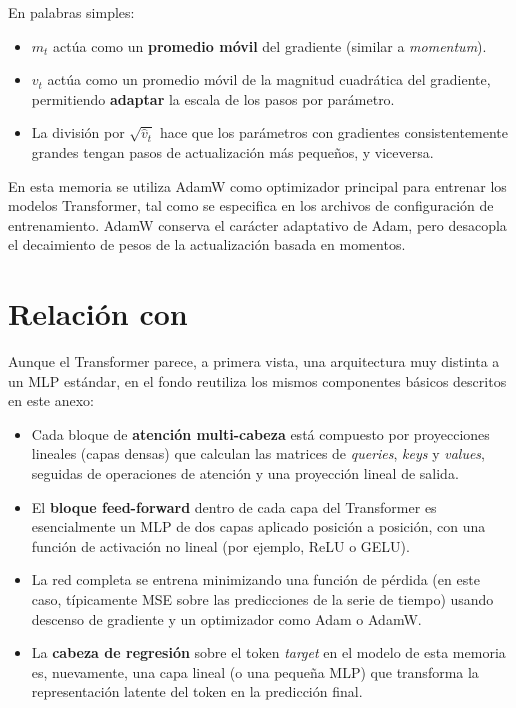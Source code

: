 En palabras simples:
\begin{itemize}
    \item $m_t$ actúa como un \textbf{promedio móvil} del gradiente (similar a \textit{momentum}).
    \item $v_t$ actúa como un promedio móvil de la magnitud cuadrática del gradiente, permitiendo \textbf{adaptar} la escala de los pasos por parámetro.
    \item La división por $\sqrt{\hat{v}_t}$ hace que los parámetros con gradientes consistentemente grandes tengan pasos de actualización más pequeños, y viceversa.
\end{itemize}

En esta memoria se utiliza AdamW como optimizador principal para entrenar los modelos Transformer, tal como se especifica en los archivos de configuración de entrenamiento. AdamW conserva el carácter adaptativo de Adam, pero desacopla el decaimiento de pesos de la actualización basada en momentos.

\section{Relación con \CTTransformer}

Aunque el Transformer parece, a primera vista, una arquitectura muy distinta a un MLP estándar, en el fondo reutiliza los mismos componentes básicos descritos en este anexo:

\begin{itemize}
    \item Cada bloque de \textbf{atención multi-cabeza} está compuesto por proyecciones lineales (capas densas) que calculan las matrices de \textit{queries}, \textit{keys} y \textit{values}, seguidas de operaciones de atención y una proyección lineal de salida.
    \item El \textbf{bloque feed-forward} dentro de cada capa del Transformer es esencialmente un MLP de dos capas aplicado posición a posición, con una función de activación no lineal (por ejemplo, ReLU o GELU).
    \item La red completa se entrena minimizando una función de pérdida (en este caso, típicamente MSE sobre las predicciones de la serie de tiempo) usando descenso de gradiente y un optimizador como Adam o AdamW.
    \item La \textbf{cabeza de regresión} sobre el token \textit{target} en el modelo de esta memoria es, nuevamente, una capa lineal (o una pequeña MLP) que transforma la representación latente del token en la predicción final.
\end{itemize}

